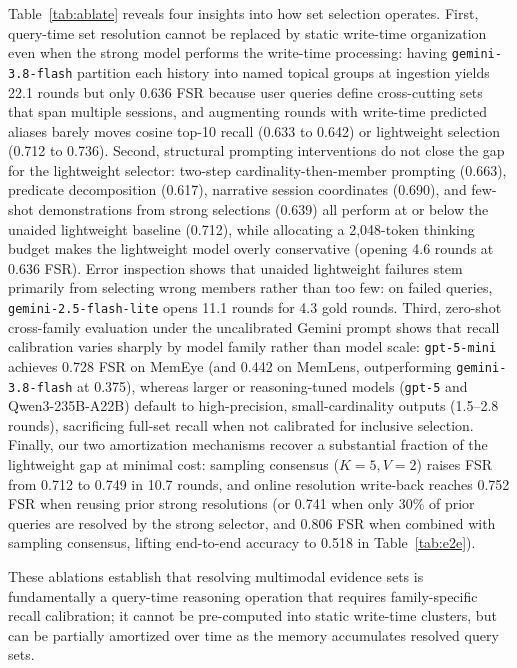 \documentclass[10pt]{article}
\begin{document}
Table~\ref{tab:ablate} reveals four insights into how set selection operates. First, query-time set resolution cannot be replaced by static write-time organization even when the strong model performs the write-time processing: having \texttt{gemini-3.8-flash} partition each history into named topical groups at ingestion yields 22.1 rounds but only 0.636 FSR because user queries define cross-cutting sets that span multiple sessions, and augmenting rounds with write-time predicted aliases barely moves cosine top-10 recall (0.633 to 0.642) or lightweight selection (0.712 to 0.736). Second, structural prompting interventions do not close the gap for the lightweight selector: two-step cardinality-then-member prompting (0.663), predicate decomposition (0.617), narrative session coordinates (0.690), and few-shot demonstrations from strong selections (0.639) all perform at or below the unaided lightweight baseline (0.712), while allocating a 2,048-token thinking budget makes the lightweight model overly conservative (opening 4.6 rounds at 0.636 FSR). Error inspection shows that unaided lightweight failures stem primarily from selecting wrong members rather than too few: on failed queries, \texttt{gemini-2.5-flash-lite} opens 11.1 rounds for 4.3 gold rounds. Third, zero-shot cross-family evaluation under the uncalibrated Gemini prompt shows that recall calibration varies sharply by model family rather than model scale: \texttt{gpt-5-mini} achieves 0.728 FSR on MemEye (and 0.442 on MemLens, outperforming \texttt{gemini-3.8-flash} at 0.375), whereas larger or reasoning-tuned models (\texttt{gpt-5} and Qwen3-235B-A22B) default to high-precision, small-cardinality outputs (1.5--2.8 rounds), sacrificing full-set recall when not calibrated for inclusive selection. Finally, our two amortization mechanisms recover a substantial fraction of the lightweight gap at minimal cost: sampling consensus ($K{=}5, V{=}2$) raises FSR from 0.712 to 0.749 in 10.7 rounds, and online resolution write-back reaches 0.752 FSR when reusing prior strong resolutions (or 0.741 when only 30\% of prior queries are resolved by the strong selector, and 0.806 FSR when combined with sampling consensus, lifting end-to-end accuracy to 0.518 in Table~\ref{tab:e2e}).

These ablations establish that resolving multimodal evidence sets is fundamentally a query-time reasoning operation that requires family-specific recall calibration; it cannot be pre-computed into static write-time clusters, but can be partially amortized over time as the memory accumulates resolved query sets.
\end{document}
